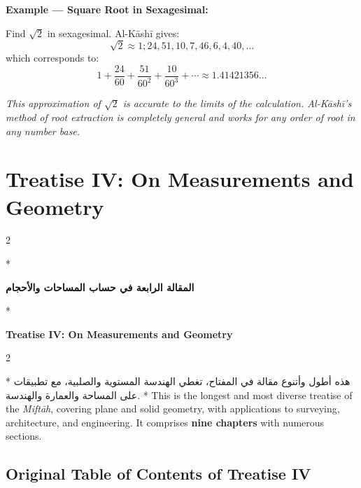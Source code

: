\documentclass[11pt,a4paper]{article}
\newcommand{\cnote}[1]{\textcolor{notecolor}{\textit{#1}}}
\newcommand{\ar}[1]{\arabicfont\beginR #1\endR}
\newenvironment{bilingual}{%
  \vspace{0.3em}%
  \begin{paracol}{2}%
}{%
  \end{paracol}%
  \vspace{0.3em}%
}
\begin{document}
\noindent\textbf{Example --- Square Root in Sexagesimal:}

Find $\sqrt{2}$ in sexagesimal. Al-K\=ash\=i gives:
\[
\sqrt{2} \approx 1; 24, 51, 10, 7, 46, 6, 4, 40, \ldots
\]
which corresponds to:
\[
1 + \frac{24}{60} + \frac{51}{60^2} + \frac{10}{60^3} + \cdots \approx
1.41421356\ldots
\]

\cnote{This approximation of $\sqrt{2}$ is accurate to the limits of
the calculation. Al-K\=ash\=i's method of root extraction is completely
general and works for any order of root in any number base.}
\clearpage

\section{Treatise IV: On Measurements and Geometry}
\label{sec:treatise4}

\begin{bilingual}
\switchcolumn[0]*
\begin{center}
\textbf{\Large\color{chapcolor}\ar{المقالة الرابعة في حساب المساحات والأحجام}}
\end{center}
\switchcolumn[1]*
\begin{center}
\textbf{\Large\color{chapcolor}Treatise IV: On Measurements and Geometry}
\end{center}
\end{bilingual}

\begin{bilingual}
\switchcolumn[0]*
\ar{هذه أطول وأتنوع مقالة في المفتاح، تغطي الهندسة المستوية والصلبية، مع تطبيقات على المساحة والعمارة والهندسة.}
\switchcolumn[1]*
This is the longest and most diverse treatise of the
\textit{Mift\=ah}, covering plane and solid geometry, with applications to
surveying, architecture, and engineering. It comprises \textbf{nine
chapters} with numerous sections.
\end{bilingual}

\subsection{Original Table of Contents of Treatise IV}
\end{document}

